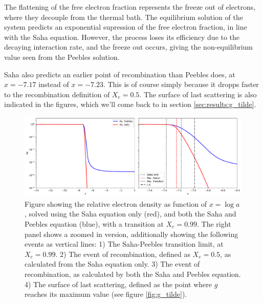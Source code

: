 \documentclass[10pt, a4paper]{article}
\begin{document}
The flattening of the free electron fraction represents the freeze out of electrons, where they decouple from the thermal bath. The equilibrium solution of the system predicts an exponential supression of the free electron fraction, in line with the Saha equation. However, the process loses its efficiency due to the decaying interaction rate, and the freeze out occurs, giving the non-equilibrium value seen from the Peebles solution.

Saha also predicts an earlier point of recombination than Peebles does, at $x = -7.17$ instead of $x = - 7.23$. This is of course simply because it dropps faster to the recombination definition of $X_e = 0.5$. The surface of last scattering is also indicated in the figures, which we'll come back to in section \ref{sec:results:g_tilde}.



\begin{figure}[H]
    \centering
    \includegraphics[scale=0.5]{../m2_figs/Xe.pdf}
    \caption{Figure showing the relative electron density as function of $x=\log{a}$, solved using the Saha equation only (red), and both the Saha and Peebles equation (blue), with a transition at $X_e = 0.99$. The right panel shows a zoomed in version, additionally showing the following events as vertical lines: 1) The Saha-Peebles transition limit, at $X_e = 0.99$. 2) The event of recombination, defined as $X_e = 0.5$, as calculated from the Saha equation only. 3) The event of recombination, as calculated by both the Saha and Peebles equation. 4) The surface of last scattering, defined as the point where $g$ reaches its maximum value (see figure \ref{fig:g_tilde}).}
    \label{fig:Xe}
\end{figure}
\end{document}
